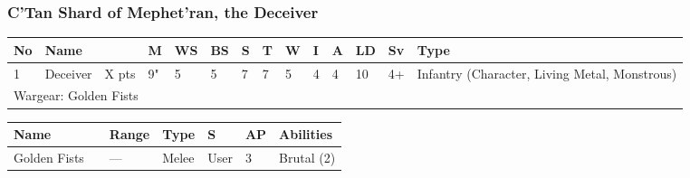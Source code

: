 \newpage
\subsubsection{C'Tan Shard of Mephet'ran, the Deceiver}

\noindent
\begin{tabular}{||m{10pt} m{90pt} m{30pt} m{11pt} m{11pt} m{11pt} m{11pt} m{11pt} m{11pt} m{11pt} m{11pt} m{11pt} m{11pt} m{135pt}||}
\hline
No & Name & & M & WS & BS & S & T & W & I & A & LD & Sv & Type \\
\hline
1 & Deceiver & X pts & 9" & 5 & 5 & 7 & 7 & 5 & 4 & 4 & 10 & 4+ & Infantry (Character, Living Metal, Monstrous)\\
\hline
\hline
\multicolumn{14}{||Z{532 pt}||}{Wargear: Golden Fists}\\
\hline
\end{tabular}

\noindent
\begin{tabular}{||m{140pt} m{0pt} m{31pt} m{55pt} m{12pt} m{12pt} m{210pt}||}
\hline
Name & & Range & Type & S & AP & Abilities \\
\hline
Golden Fists &  & — & Melee & User & 3 & Brutal (2) \\
\hline
\end{tabular}

